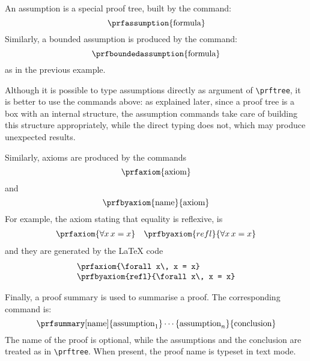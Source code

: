 \documentclass{amsart}
\begin{document}
An assumption is a special proof tree, built by the command:
\begin{displaymath}
  \verb|\prfassumption|\{\text{formula}\}
\end{displaymath}
Similarly, a bounded assumption is produced by the command:
\begin{displaymath}
  \verb|\prfboundedassumption|\{\text{formula}\}
\end{displaymath}
as in the previous example.

Although it is possible to type assumptions directly as argument of
\verb|\prftree|, it is better to use the commands above: as explained
later, since a proof tree is a box with an internal structure, the
assumption commands take care of building this structure
appropriately, while the direct typing does not, which may produce
unexpected results.\vspace{2ex}

Similarly, axioms are produced by the commands
\begin{displaymath}
  \verb|\prfaxiom|\{\mbox{axiom}\}
\end{displaymath}
and
\begin{displaymath}
  \verb|\prfbyaxiom|\{\mbox{name}\}\{\mbox{axiom}\}
\end{displaymath}
For example, the axiom stating that equality is reflexive, is 
\begin{displaymath}
  \begin{array}{cc}
    \prfaxiom{\forall x\, x = x} &
    \prfbyaxiom{refl}{\forall x\, x = x}
  \end{array}
\end{displaymath}
and they are generated by the \LaTeX{} code
\begin{displaymath}
  \begin{array}{l}
    \verb|\prfaxiom{\forall x\, x = x}|\\
    \verb|\prfbyaxiom{refl}{\forall x\, x = x}|
  \end{array}
\end{displaymath}\vspace{-.2ex}

Finally, a proof summary is used to summarise a proof. The
corresponding command is:
\begin{displaymath}
  \verb|\prfsummary|[\mbox{name}]\{\mbox{assumption}_1\} \cdots
  \{\mbox{assumption}_n\}\{\mbox{conclusion}\}
\end{displaymath}
The name of the proof is optional, while the assumptions and the
conclusion are treated as in \verb|\prftree|. When present, the proof
name is typeset in text mode.
\end{document}

